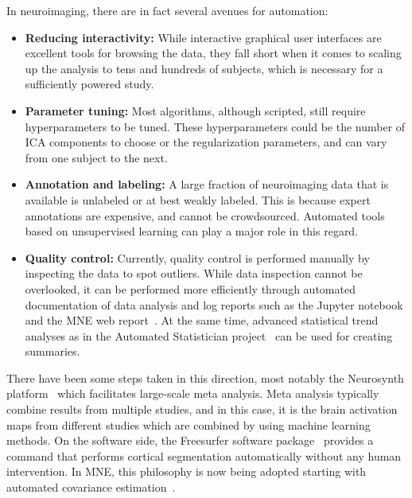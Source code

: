 In neuroimaging, there are in fact several avenues for automation:
\begin{itemize}[noitemsep,nolistsep,nosep]
\item \textbf{Reducing interactivity:} While interactive graphical user interfaces are excellent tools for browsing the data, they fall short when it comes to scaling up the analysis to tens and hundreds of subjects, which is necessary for a sufficiently powered study. 

\item \textbf{Parameter tuning:} Most algorithms, although scripted, still require hyperparameters to be tuned. These hyperparameters could be the number of ICA components to choose or the regularization parameters, and can vary from one subject to the next.
\item \textbf{Annotation and labeling:} A large fraction of neuroimaging data that is available is unlabeled or at best weakly labeled. This is because expert annotations are expensive, and cannot be crowdsourced. Automated tools based on unsupervised learning can play a major role in this regard.
\item \textbf{Quality control:} Currently, quality control is performed manually by inspecting the data to spot outliers. While data inspection cannot be overlooked, it can be performed more efficiently through automated documentation of data analysis and log reports such as the Jupyter notebook and the MNE web report~\citep{dengemann2015conc}. At the same time, advanced statistical trend analyses as in the Automated Statistician project~\citep{duvenaud2013structure} can be used for creating summaries.
\end{itemize}

There have been some steps taken in this direction, most notably the Neurosynth platform~\citep{yarkoni2011large} which facilitates large-scale meta analysis. Meta analysis typically combine results from multiple studies, and in this case, it is the brain activation maps from different studies which are combined by using machine learning methods. On the software side, the Freesurfer software package~\citep{dale-fischl-etal:99, fischl-serena-etal:99} provides a  command that performs cortical segmentation automatically without any human intervention. In MNE, this philosophy is now being adopted starting with automated covariance estimation~\citep{engemann2015automated_new}.

